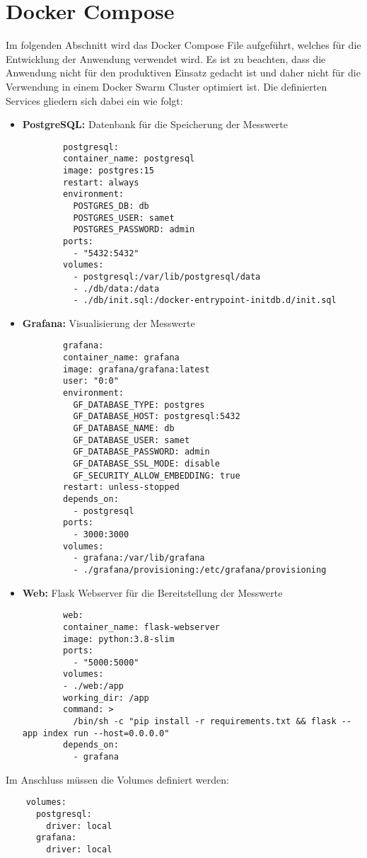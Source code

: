 \chapter{Docker Compose}
\label{appendix:docker_compose}
Im folgenden Abschnitt wird das Docker Compose File aufgeführt, welches für die Entwicklung der Anwendung verwendet wird. Es ist zu beachten, dass die Anwendung nicht für den produktiven Einsatz gedacht ist und daher nicht für die Verwendung in einem Docker Swarm Cluster optimiert ist. Die definierten Services gliedern sich dabei ein wie folgt:

\begin{itemize}
    \item \textbf{PostgreSQL:} Datenbank für die Speicherung der Messwerte
    \begin{verbatim}
        postgresql:
        container_name: postgresql
        image: postgres:15
        restart: always
        environment:
          POSTGRES_DB: db
          POSTGRES_USER: samet
          POSTGRES_PASSWORD: admin
        ports:
          - "5432:5432"
        volumes:
          - postgresql:/var/lib/postgresql/data
          - ./db/data:/data
          - ./db/init.sql:/docker-entrypoint-initdb.d/init.sql
    \end{verbatim}
    \item \textbf{Grafana:} Visualisierung der Messwerte
    \begin{verbatim}
        grafana:
        container_name: grafana
        image: grafana/grafana:latest
        user: "0:0"
        environment:
          GF_DATABASE_TYPE: postgres
          GF_DATABASE_HOST: postgresql:5432
          GF_DATABASE_NAME: db
          GF_DATABASE_USER: samet
          GF_DATABASE_PASSWORD: admin
          GF_DATABASE_SSL_MODE: disable
          GF_SECURITY_ALLOW_EMBEDDING: true
        restart: unless-stopped
        depends_on:
          - postgresql
        ports:
          - 3000:3000
        volumes:
          - grafana:/var/lib/grafana
          - ./grafana/provisioning:/etc/grafana/provisioning
    \end{verbatim}
    \item \textbf{Web:} Flask Webserver für die Bereitstellung der Messwerte
    \begin{verbatim}
        web:
        container_name: flask-webserver
        image: python:3.8-slim
        ports:
          - "5000:5000"
        volumes:
        - ./web:/app
        working_dir: /app
        command: > 
          /bin/sh -c "pip install -r requirements.txt && flask --app index run --host=0.0.0.0"
        depends_on:
          - grafana
    \end{verbatim}
\end{itemize}

Im Anschluss müssen die Volumes definiert werden:
\begin{verbatim}
    volumes:
      postgresql:
        driver: local
      grafana:
        driver: local
\end{verbatim}